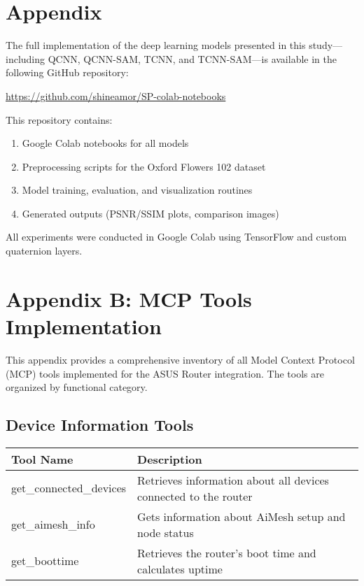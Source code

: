\chapter*{Appendix}

The full implementation of the deep learning models presented in this study—including QCNN, QCNN-SAM, TCNN, and TCNN-SAM—is available in the following GitHub repository:

\url{https://github.com/shineamor/SP-colab-notebooks}

This repository contains:
\begin{enumerate}
    \item Google Colab notebooks for all models
    \item Preprocessing scripts for the Oxford Flowers 102 dataset
    \item Model training, evaluation, and visualization routines
    \item Generated outputs (PSNR/SSIM plots, comparison images)
\end{enumerate}

All experiments were conducted in Google Colab using TensorFlow and custom quaternion layers.

\chapter*{Appendix B: MCP Tools Implementation}
\label{app:mcp_tools}

This appendix provides a comprehensive inventory of all Model Context Protocol (MCP) tools implemented for the ASUS Router integration. The tools are organized by functional category.

\section*{Device Information Tools}
\begin{tabular}{|p{6cm}|p{9cm}|}
\hline
\textbf{Tool Name} & \textbf{Description} \\
\hline
get\_connected\_devices & Retrieves information about all devices connected to the router \\
\hline
get\_aimesh\_info & Gets information about AiMesh setup and node status \\
\hline
get\_boottime & Retrieves the router's boot time and calculates uptime \\
\hline
\end{tabular}

